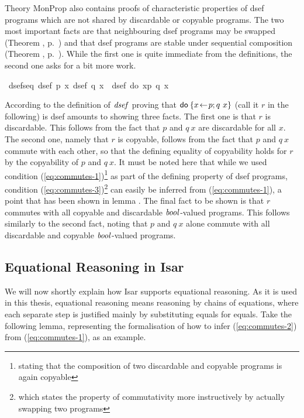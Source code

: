 Theory MonProp also contains proofs of characteristic properties of dsef
programs which are not shared by discardable or copyable programs. The two most
important facts are that neighbouring dsef programs may be swapped (Theorem
, p.~\pageref{isa:commute-dsef}) and that dsef programs
are stable under sequential composition (Theorem ,
p.~\pageref{isa:dsef-seq}). While the first one is quite immediate from the
definitions, the second one asks for a bit more work. 
\begin{isabellebody}
\isanewline
{}\ dsef{\isacharunderscore}seq{\isacharcolon}\ {\isachardoublequote}{\isasymlbrakk}dsef\ p{\isacharsemicolon}\ {\isasymforall}x{\isachardot}\ dsef\ {\isacharparenleft}q\ x{\isacharparenright}{\isasymrbrakk}\ {\isasymLongrightarrow}\ dsef\ {\isacharparenleft}do\ {\isacharbraceleft}x{\isasymleftarrow}p{\isacharsemicolon}\ q\ x{\isacharbraceright}{\isacharparenright}{\isachardoublequote}\isanewline
\end{isabellebody}

According to the definition of $\mathit{dsef}$ proving that $\mathsf{do}\: \{x\!\gets\! p; q\
  x\}$ (call it $r$ in the following) is dsef amounts to showing three facts. The
first one is that $r$ is discardable. This follows from the fact that $p$ and
$q\ x$ are discardable for all $x$. The second one, namely that $r$ is copyable,
follows from the fact that $p$ and $q\ x$ commute with each other, so that the
defining equality of copyability holds for $r$ by the copyability of $p$ and $q\
x$. It must be noted here that while we used condition
(\ref{eq:commutes-1})\footnote{stating that the composition of two discardable
  and copyable programs is again copyable} as part of the defining property of
dsef programs, condition (\ref{eq:commutes-3})\footnote{which states the
  property of commutativity more instructively by actually swapping two
  programs} can easily be inferred from (\ref{eq:commutes-1}), a point that has
been shown in lemma \irule{commute-1-3}. The final fact to be shown is that
$r$ commutes with all copyable and discardable $\mathit{bool}$-valued programs.
This follows similarly to the second fact, noting that $p$ and $q\ x$ alone
commute with all discardable and copyable $\mathit{bool}$-valued programs.

\subsection{Equational Reasoning in Isar}
\label{sec:eq-reason-isar}
We will now shortly explain how Isar supports equational reasoning. As it is
used in this thesis, equational reasoning means reasoning by chains of
equations, where each separate step is justified mainly by substituting equals
for equals. Take the following lemma, representing the formalisation of how to
infer (\ref{eq:commutes-2}) from (\ref{eq:commutes-1}), as an example.

